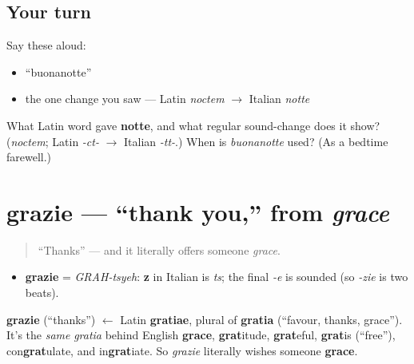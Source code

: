 \subsection*{Your turn}
Say these aloud:

\begin{itemize}
\raggedright
  \item \textquotedblleft{}buonanotte\textquotedblright{}
  \item the one change you saw — Latin \emph{noctem} $\to$ Italian \emph{notte}
\end{itemize}

\begin{tcolorbox}[breakable,colback=teal!4,colframe=teal!35!black,title={Before you move on}]
What Latin word gave \textbf{notte}, and what regular sound-change does it show? (\emph{noctem}; Latin \emph{-ct-} $\to$ Italian \emph{-tt-}.) When is \emph{buonanotte} used? (As a bedtime farewell.)
\end{tcolorbox}
\section[grazie]{grazie — \textquotedblleft{}thank you,\textquotedblright{} from \emph{grace}}

\label{lesson:IT-C01-grazie}



\begin{quote}
\textquotedblleft{}Thanks\textquotedblright{} — and it literally offers someone \emph{grace}.
\end{quote}

\begin{sounds}
\begin{itemize}
\raggedright
  \item \textbf{grazie} = \emph{GRAH-tsyeh}: \textbf{z} in Italian is \emph{ts}; the final \emph{-e} is sounded (so \emph{-zie} is two beats).
\end{itemize}
\end{sounds}

\begin{cousinweb}
\textbf{grazie} (\textquotedblleft{}thanks\textquotedblright{}) $\leftarrow$ Latin \textbf{gratiae}, plural of \textbf{gratia} (\textquotedblleft{}favour, thanks, grace\textquotedblright{}). It's the \emph{same} \emph{gratia} behind English \textbf{grace}, \textbf{grat}itude, \textbf{grat}eful, \textbf{grat}is (\textquotedblleft{}free\textquotedblright{}), con\textbf{grat}ulate, and in\textbf{grat}iate. So \emph{grazie} literally wishes someone \textbf{grace}.
\end{cousinweb}

